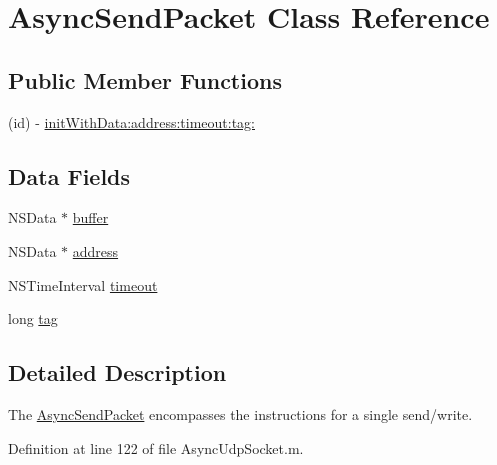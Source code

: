 \hypertarget{interface_async_send_packet}{
\section{AsyncSendPacket Class Reference}
\label{interface_async_send_packet}
}
\subsection*{Public Member Functions}
\begin{DoxyCompactItemize}
\item 
(id) -\/ \hyperlink{interface_async_send_packet_aacf706bb60d6f18d80523b96ffcbc99d}{initWithData:address:timeout:tag:}
\end{DoxyCompactItemize}
\subsection*{Data Fields}
\begin{DoxyCompactItemize}
\item 
NSData $\ast$ \hyperlink{interface_async_send_packet_ad22b56df684e13a8ab95555fc889b553}{buffer}
\item 
NSData $\ast$ \hyperlink{interface_async_send_packet_ae73473f4e69fd42689f8de0cc994726a}{address}
\item 
NSTimeInterval \hyperlink{interface_async_send_packet_a39233eb85b4cbae04411577510e7c5e6}{timeout}
\item 
long \hyperlink{interface_async_send_packet_ae10c29173f0af40507d7e787905c7130}{tag}
\end{DoxyCompactItemize}


\subsection{Detailed Description}
The \hyperlink{interface_async_send_packet}{AsyncSendPacket} encompasses the instructions for a single send/write. 

Definition at line 122 of file AsyncUdpSocket.m.



